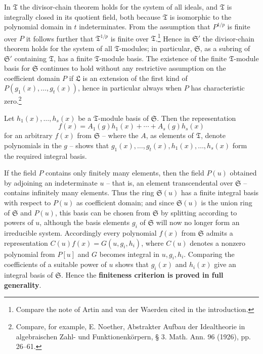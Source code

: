 \documentclass[11pt]{article}
\begin{document}
In $\mathfrak T$ the divisor-chain theorem holds for the system of all ideals, and $\mathfrak T$ is integrally closed in its quotient field, both because $\mathfrak T$ is isomorphic to the polynomial domain in $t$ indeterminates. From the assumption that $P^{1/p}$ is finite over $P$ it follows further that $\mathfrak T^{1/p}$ is finite over $\mathfrak T$.\footnote{Compare the note of Artin and van der Waerden cited in the introduction.} Hence in $\mathfrak S'$ the divisor-chain theorem holds for the system of all $\mathfrak T$-modules; in particular, $\mathfrak S$, as a subring of $\mathfrak S'$ containing $\mathfrak T$, has a finite $\mathfrak T$-module basis\footnotemark[\value{footnote}]. The existence of the finite $\mathfrak T$-module basis for $\mathfrak S$ continues to hold without any restrictive assumption on the coefficient domain $P$ if $\mathfrak L$ is an extension of the first kind of $P(g_1(x),\ldots,g_t(x))$, hence in particular always when $P$ has characteristic zero.\footnote{Compare, for example, E. Noether, Abstrakter Aufbau der Idealtheorie in algebraischen Zahl- und Funktionenkörpern, § 3. Math. Ann. 96 (1926), pp. 26--61.}

Let $h_1(x),\ldots,h_s(x)$ be a $\mathfrak T$-module basis of $\mathfrak S$. Then the representation
\[
 f(x)=A_1(g)h_1(x)+\cdots+A_s(g)h_s(x)
\]
for an arbitrary $f(x)$ from $\mathfrak S$ -- where the $A$, as elements of $\mathfrak T$, denote polynomials in the $g$ -- shows that $g_1(x),\ldots,g_t(x),h_1(x),\ldots,h_s(x)$ form the required integral basis.

If the field $P$ contains only finitely many elements, then the field $P(u)$ obtained by adjoining an indeterminate $u$ -- that is, an element transcendental over $\mathfrak S$ -- contains infinitely many elements. Thus the ring $\mathfrak S(u)$ has a finite integral basis with respect to $P(u)$ as coefficient domain; and since $\mathfrak S(u)$ is the union ring of $\mathfrak S$ and $P(u)$, this basis can be chosen from $\mathfrak S$ by splitting according to powers of $u$, although the basis elements $g_i$ of $\mathfrak S$ will now no longer form an irreducible system. Accordingly every polynomial $f(x)$ from $\mathfrak S$ admits a representation $C(u)f(x)=G(u,g_i,h_i)$, where $C(u)$ denotes a nonzero polynomial from $P[u]$ and $G$ becomes integral in $u,g_i,h_i$. Comparing the coefficients of a suitable power of $u$ shows that $g_i(x)$ and $h_i(x)$ give an integral basis of $\mathfrak S$. Hence the \textbf{finiteness criterion is proved in full generality}.
\end{document}
